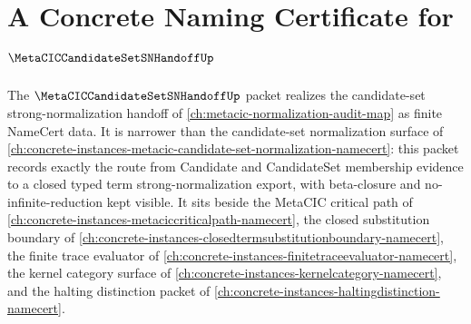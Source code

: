 \chapter{A Concrete Naming Certificate for $\MetaCICCandidateSetSNHandoffUp$}
\label{ch:concrete-instances-metacic-candidate-set-sn-handoff-namecert}

The $\MetaCICCandidateSetSNHandoffUp$ packet realizes the candidate-set strong-normalization handoff of \autoref{ch:metacic-normalization-audit-map} as finite NameCert data. It is narrower than the candidate-set normalization surface of \autoref{ch:concrete-instances-metacic-candidate-set-normalization-namecert}: this packet records exactly the route from Candidate and CandidateSet membership evidence to a closed typed term strong-normalization export, with beta-closure and no-infinite-reduction kept visible. It sits beside the MetaCIC critical path of \autoref{ch:concrete-instances-metaciccriticalpath-namecert}, the closed substitution boundary of \autoref{ch:concrete-instances-closedtermsubstitutionboundary-namecert}, the finite trace evaluator of \autoref{ch:concrete-instances-finitetraceevaluator-namecert}, the kernel category surface of \autoref{ch:concrete-instances-kernelcategory-namecert}, and the halting distinction packet of \autoref{ch:concrete-instances-haltingdistinction-namecert}.

